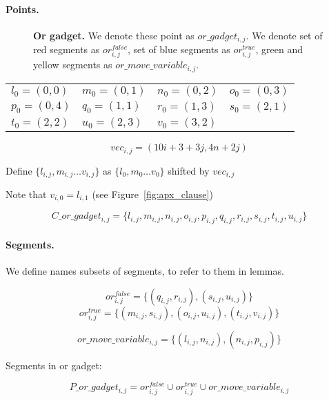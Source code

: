 \paragraph{Points.}

\begin{figure}[h]
\centering
\def\svgwidth{0.5\columnwidth}

\caption{
\textbf{Or gadget.} We denote these point as $or\_gadget_{i, j}$. 
We denote set of red segments as $or^{false}_{i, j}$,
set of blue segments as $or^{true}_{i, j}$,
green and yellow segments as $or\_move\_variable_{i, j}$.
}
\label{fig:apx_or_gadget}
\end{figure}

	\begin{center}
\begin{tabular}{ l l l l}

	$l_0 = (0, 0)$ &
	$m_0 = (0, 1)$ &
	$n_0 = (0, 2)$ &
	$o_0 = (0, 3)$ \\
	$p_0 = (0, 4)$ &
	$q_0 = (1, 1)$ &
	$r_0 = (1, 3)$ &
	$s_0 = (2, 1)$ \\
	$t_0 = (2, 2)$ &
	$u_0 = (2, 3)$ &
	$v_0 = (3, 2)$ &
\end{tabular}
\end{center}


	$$vec_{i, j} = (10i + 3 + 3j, 4n + 2j)$$
	
	Define 
	$\{ l_{i, j}, m_{i, j} \ldots v_{i, j} \}$
	as $\{l_0, m_0 \ldots v_0\}$ shifted by $vec_{i, j}$

Note that $v_{i, 0} = l_{i, 1}$ (see Figure~\ref{fig:apx_clause})
 
  $$C\_or\_gadget_{i, j} = 
 \{l_{i, j}, m_{i, j}, n_{i, j}, o_{i, j},
 p_{i, j}, q_{i, j}, r_{i, j}, s_{i, j}, t_{i, j}, u_{i, j} \}
 $$
 
\paragraph{Segments.}

We define names subsets of segments, to refer to them in lemmas.
 
$$or^{false}_{i, j} =
\{ (q_{i, j}, r_{i, j}), (s_{i, j}, u_{i, j})\}$$
$$or^{true}_{i, j} =
\{ (m_{i, j}, s_{i, j}), (o_{i, j}, u_{i, j}),
(t_{i, j}, v_{i, j}) \}$$

$$or\_move\_variable_{i, j} =
\{ (l_{i, j}, n_{i, j}), (n_{i, j}, p_{i, j})\}$$

Segments in or gadget:

$$P\_or\_gadget_{i, j} = 
  or^{false}_{i, j} \cup or^{true}_{i, j} \cup or\_move\_variable_{i, j}
  $$


